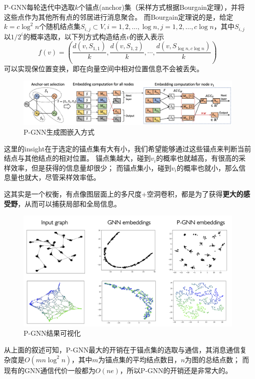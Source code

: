 \documentclass[reportComp]{thesis}
\begin{document}
P-GNN每轮迭代中选取$k$个锚点(anchor)集（采样方式根据Bourgain定理），并将这些点作为其他所有点的邻居进行消息聚合。
而Bourgain定理说的是，给定$k=c\log^2n$个随机结点集$S_{i,j}\subset V,i=1,2,\ldots,\log n,j=1,2,\ldots,c\log n$，其中$S_{i,j}$以$1/2^i$的概率选取，以下列方式构造结点$v$的嵌入表示
\[f(v)=\left(\frac{d(v,S_{1,1})}{k},\frac{d(v,S_{1,2})}{k},\cdots,\frac{d(v,S_{\log n,c\log n})}{k}\right)\]
可以实现保位置变换，即在向量空间中相对位置信息不会被丢失。
\begin{figure}[H]
\centering
\includegraphics[width=0.8\linewidth]{fig/PGNN.png}
\caption{P-GNN生成图嵌入方式}
\end{figure}

这里的insight在于选定的锚点集有大有小，我们希望能够通过这些锚点来判断当前结点与其他结点的相对位置。
锚点集越大，碰到$v_i$的概率也就越高，有很高的采样效率，但是获得的信息量却很少；
而锚点集小，碰到$v_i$的概率也就小，那么信息量也就大，尽管采样效率低。

这其实是一个权衡，有点像图层面上的多尺度+空洞卷积，都是为了获得\textbf{更大的感受野}，从而可以捕获局部和全局信息。
\begin{figure}[H]
\centering
\includegraphics[width=0.8\linewidth]{fig/PGNN_results.png}
\caption{P-GNN结果可视化}
\end{figure}


从上面的叙述可知，P-GNN最大的开销在于锚点集的选取与通信，其消息通信复杂度是$O(mn\log^2 n)$，其中$m$为锚点集的平均结点数目，$n$为图的总结点数；
而现有的GNN通信代价一般都为$O(ne)$，所以P-GNN的开销还是非常大的。
\end{document}

